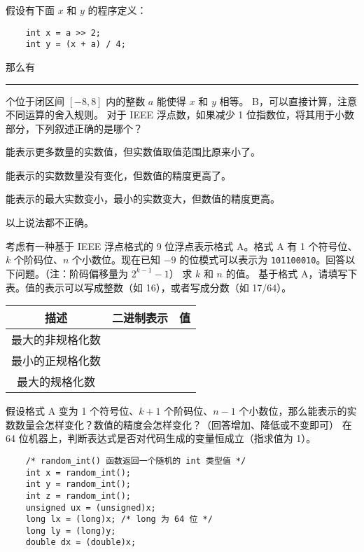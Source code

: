 \begin{problems}
\begin{choices}
		\end{choices}
		 假设有下面 $x$ 和 $y$ 的程序定义：
		\begin{verbatim}
    int x = a >> 2;
    int y = (x + a) / 4;
		\end{verbatim}
		那么有 \rule{2.5cm}{0.25mm} 个位于闭区间 $[-8, 8]$ 内的整数 $a$ 能使得 $x$ 和 $y$ 相等。
		\sol B，可以直接计算，注意不同运算的舍入规则。
         对于 IEEE 浮点数，如果减少 1 位指数位，将其用于小数部分，下列叙述正确的是哪个？
		\begin{choices}
			\item 能表示更多数量的实数值，但实数值取值范围比原来小了。
			\item 能表示的实数数量没有变化，但数值的精度更高了。
			\item 能表示的最大实数变小，最小的实数变大，但数值的精度更高。
			\item 以上说法都不正确。
        \end{choices}
		 考虑有一种基于 IEEE 浮点格式的 9 位浮点表示格式 A。格式 A 有 1 个符号位、$k$ 个阶码位、$n$ 个小数位。现在已知 $-9$ 的位模式可以表示为 \texttt{101100010}。回答以下问题。（注：阶码偏移量为 $2^{k-1}-1$）
			\qn 求 $k$ 和 $n$ 的值。
			\qn 基于格式 A，请填写下表。值的表示可以写成整数（如 16），或者写成分数（如 17/64）。
			\begin{table}[H]
				\centering
				\begin{tabular}{|c|c|c|}
					\hline
					描述 & 二进制表示 & 值 \\ \hline
					最大的非规格化数 & {\qquad \qquad} & {\qquad \qquad} \\ \hline
					最小的正规格化数 & {\qquad \qquad} & {\qquad \qquad} \\ \hline
					最大的规格化数 & {\qquad \qquad} & {\qquad \qquad} \\ \hline
				\end{tabular}
			\end{table}
			\qn 假设格式 A 变为 1 个符号位、$k+1$ 个阶码位、$n-1$ 个小数位，那么能表示的实数数量会怎样变化？数值的精度会怎样变化？（回答增加、降低或不变即可）
		 在 64 位机器上，判断表达式是否对代码生成的变量恒成立（指求值为 1）。
		\begin{verbatim}
    /* random_int() 函数返回一个随机的 int 类型值 */
    int x = random_int();
    int y = random_int();
    int z = random_int();
    unsigned ux = (unsigned)x;
    long lx = (long)x; /* long 为 64 位 */
    long ly = (long)y;
    double dx = (double)x;

\end{verbatim}
\end{problems}
